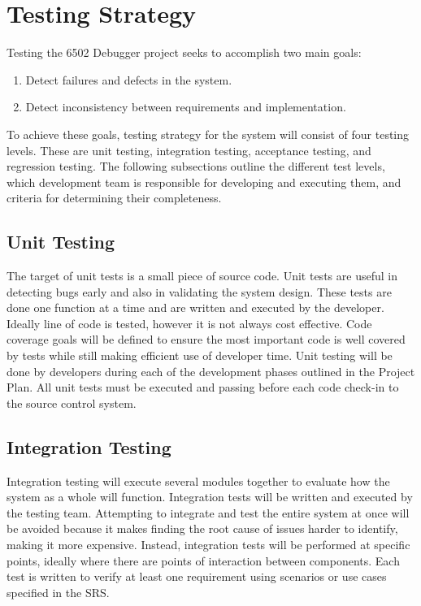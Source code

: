 \documentclass[a3paper, 11pt]{article}
\newcommand\tab[1][1cm]{\hspace*{#1}}
\begin{document}
\section{Testing Strategy}
Testing the 6502 Debugger project seeks to accomplish two main goals:
\begin{enumerate}
	\item Detect failures and defects in the system.
	\item Detect inconsistency between requirements and implementation. 
\end{enumerate}
To achieve these goals, testing strategy for the system will consist of four testing levels. These are unit testing, integration testing, acceptance testing, and regression testing. The following subsections outline the different test levels, which development team is responsible for developing and executing them, and criteria for determining their completeness. 

\subsection{Unit Testing}
The target of unit tests is a small piece of source code. Unit tests are useful in detecting bugs early and also in validating the system design. These tests are done one function at a time and are written and executed by the developer. Ideally line of code is tested, however it is not always cost effective. Code coverage goals will be defined to ensure the most important code is well covered by tests while still making efficient use of developer time.
\tab Unit testing will be done by developers during each of the development phases outlined in the Project Plan. All unit tests must be executed and passing before each code check-in to the source control system.

\subsection{Integration Testing}
Integration testing will execute several modules together to evaluate how the system as a whole will function. Integration tests will be written and executed by the testing team. Attempting to integrate and test the entire system at once will be avoided because it makes finding the root cause of issues harder to identify, making it more expensive. Instead, integration tests will be performed at specific points, ideally where there are points of interaction between components. Each test is written to verify at least one requirement using scenarios or use cases specified in the SRS. 
\end{document}
